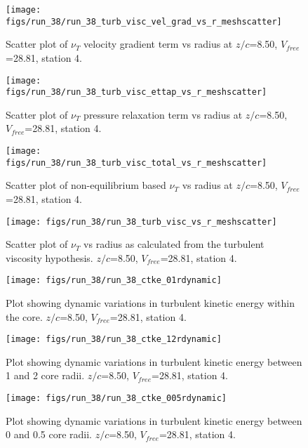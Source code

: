 \begin{figure}[H]
\centering
\texttt{[image: figs/run\_38/run\_38\_turb\_visc\_vel\_grad\_vs\_r\_meshscatter]}
\caption{Scatter plot of $\nu_T$ velocity gradient term vs radius at $z/c$=8.50, $V_{free}$=28.81, station 4.}
\end{figure}


\begin{figure}[H]
\centering
\texttt{[image: figs/run\_38/run\_38\_turb\_visc\_ettap\_vs\_r\_meshscatter]}
\caption{Scatter plot of $\nu_T$ pressure relaxation term vs radius at $z/c$=8.50, $V_{free}$=28.81, station 4.}
\end{figure}


\begin{figure}[H]
\centering
\texttt{[image: figs/run\_38/run\_38\_turb\_visc\_total\_vs\_r\_meshscatter]}
\caption{Scatter plot of non-equilibrium based $\nu_T$ vs radius at $z/c$=8.50, $V_{free}$=28.81, station 4.}
\end{figure}


\begin{figure}[H]
\centering
\texttt{[image: figs/run\_38/run\_38\_turb\_visc\_vs\_r\_meshscatter]}
\caption{Scatter plot of $\nu_T$ vs radius as calculated from the turbulent viscosity hypothesis. $z/c$=8.50, $V_{free}$=28.81, station 4.}
\end{figure}


\begin{figure}[H]
\centering
\texttt{[image: figs/run\_38/run\_38\_ctke\_01rdynamic]}
\caption{Plot showing dynamic variations in turbulent kinetic energy within the core. $z/c$=8.50, $V_{free}$=28.81, station 4.}
\end{figure}


\begin{figure}[H]
\centering
\texttt{[image: figs/run\_38/run\_38\_ctke\_12rdynamic]}
\caption{Plot showing dynamic variations in turbulent kinetic energy between 1 and 2 core radii. $z/c$=8.50, $V_{free}$=28.81, station 4.}
\end{figure}


\begin{figure}[H]
\centering
\texttt{[image: figs/run\_38/run\_38\_ctke\_005rdynamic]}
\caption{Plot showing dynamic variations in turbulent kinetic energy between 0 and 0.5 core radii. $z/c$=8.50, $V_{free}$=28.81, station 4.}
\end{figure}


